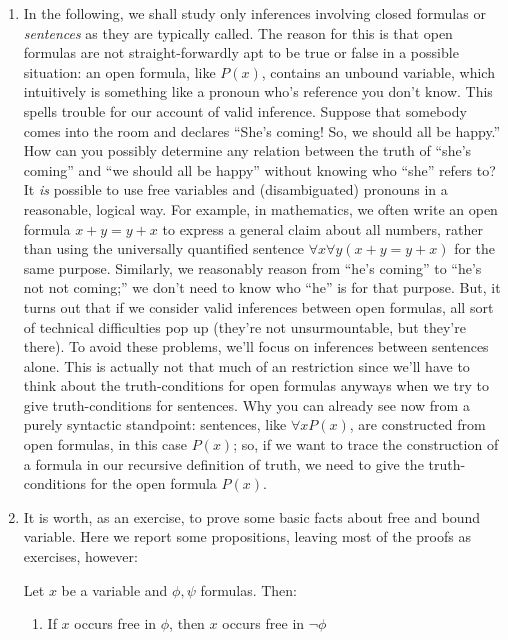 \begin{enumerate}[\thesection.1]
	  \item In the following, we shall study only inferences involving closed formulas or \emph{sentences} as they are typically called.
		The reason for this is that open formulas are not straight-forwardly apt to be true or false in a possible situation: an open formula, like $P(x)$, contains an unbound variable, which intuitively is something like a pronoun who's reference you don't know.
		This spells trouble for our account of valid inference.
		Suppose that somebody comes into the room and declares ``She's coming! So, we should all be happy.''
		How can you possibly determine any relation between the truth of ``she's coming'' and ``we should all be happy'' without knowing who ``she'' refers to?
		It \emph{is} possible to use free variables and (disambiguated) pronouns in a reasonable, logical way.
		For example, in mathematics, we often write an open formula
		$x+y=y+x$
		to express a general claim about all numbers, rather than using the universally quantified sentence
		$\forall x\forall y(x+y=y+x)$
		for the same purpose.
		Similarly, we reasonably reason from ``he's coming'' to ``he's not not coming;'' we don't need to know who ``he'' is for that purpose.
		But, it turns out that if we consider valid inferences between open formulas, all sort of technical difficulties pop up (they're not unsurmountable, but they're there).
		To avoid these problems, we'll focus on inferences between sentences alone.
		This is actually not that much of an restriction since we'll have to think about the truth-conditions for open formulas anyways when we try to give truth-conditions for sentences.
		Why you can already see now from a purely syntactic standpoint:
		sentences, like
		$\forall xP(x)$,
		are constructed from open formulas,
		in this case $P(x)$;
		so, if we want to trace the construction of a formula in our recursive definition of truth, we need to give the truth-conditions for the open formula
$P(x)$.
		\item It is worth, as an exercise, to prove some basic facts about free and bound variable. Here we report some propositions, leaving most of the proofs as exercises, however:
		
		\begin{proposition}
		Let $x$ be a variable and $\phi,\psi$ formulas. Then:
		\begin{enumerate}[1.]
		
			\item If $x$ occurs free in $\phi$, then $x$ occurs free in $\neg\phi$
			

\end{enumerate}
\end{proposition}
\end{enumerate}
